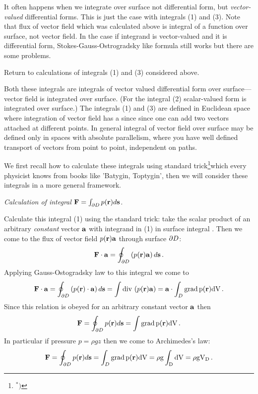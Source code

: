  It often happens when we integrate over surface 
not differential
form, but {\it vector-valued} differential forms. 
This is just the case with integrals (1) and (3).
Note that flux of vector field which was
calculated above is integral of a function over surface, not vector field.
In the case if integrand is vector-valued  and it is differential form,
Stokes-Gauss-Ostrogradsky like formula still works but there are some problems.
 
   Return to calculations of integrals (1) and (3) considered above.

  Both these integrals are integrals of vector valued differential form over
surface---vector field is integrated over surface.
(For the integral (2) scalar-valued form is integrated over surface.)
   The integrals (1) and (3) are defined
in Euclidean space where integration of vector field has a since since
one can add two vectors attached at different points.
In general integral of vector field over surface may be 
defined only in spaces
with absolute parallelism, where you have well defined transport of vectors
 from point to point, independent on paths.

\smallskip

We first recall how to calculate these integrals using 
standard trick\footnote{${^*)}$}{which every physicist 
knows from books like
 'Batygin, Toptygin'}, then we will consider these 
integrals in a more general framework.


\smallskip

{\sl Calculation of integral ${\bf F}=\int_{\partial D}p({\bf r})d{\bf s }$.}

\smallskip

Calculate this integral (1) using the standard trick:
take the scalar product of an arbitrary {\it constant} vector ${\bf a}$   
with  integrand in (1) in surface integral .
  Then we come to the flux of vector field
$p({\bf r}){\bf a}$ through surface $\partial D$: 
       $$
 {{\bf F}}\cdot{\bf a}= \oint_{\partial D} \left (p({\bf r}){\bf a}\right)d {\bf s }\,.
       $$ 
Applying  Gauss-Ostogradsky law to this integral we come to 
       $$
 {{\bf F}}\cdot{\bf a}= \oint_{\partial D} \left (p({\bf r})\cdot {\bf a}\right)d {\bf s }=
     \int {\rm div\,}\left(p({\bf r}){\bf a}\right)=
    {\bf a}\cdot\int_D \rm grad\, p({\bf r})dV\,.
               $$
Since this relation is obeyed for an arbitrary constant vector ${\bf a}$ then
     $$
  {\bf F}=\oint_{\partial D} p({\bf r})d{\bf s }=\int\rm grad\, p({\bf r})dV\,.
     $$
In particular if pressure $p=\rho gz$ then we come to Archimedes's law:
     $$
  {\bf F}=\oint_{\partial D} p({\bf r})d{\bf s }=\int_D\rm grad\, p({\bf r})dV=\rho g\int_D dV=\rho gV_D\,. 
     $$

